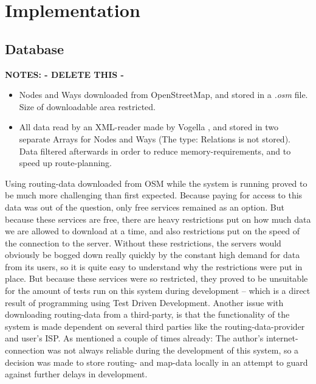 \chapter{Implementation}




\section{Database}
\textbf{NOTES: - DELETE THIS -}
\begin{itemize}
	\item Nodes and Ways downloaded from OpenStreetMap\cite{OSM}, and stored in a \textit{.osm} file. Size of downloadable area restricted.
	\item All data read by an XML-reader made by Vogella \cite{Vogella-XML}, and stored in two separate Arrays for Nodes and Ways (The type: Relations is not stored). Data filtered afterwards in order to reduce memory-requirements, and to speed up route-planning.
\end{itemize}

Using routing-data downloaded from OSM while the system is running proved to be much more challenging than first expected. Because paying for access to this data was out of the question, only free services remained as an option. But because these services are free, there are heavy restrictions put on how much data we are allowed to download at a time, and also restrictions put on the speed of the connection to the server. Without these restrictions, the servers would obviously be bogged down really quickly by the constant high demand for data from its users, so it is quite easy to understand why the restrictions were put in place. But because these services were so restricted, they proved to be unsuitable for the amount of tests run on this system during development -- which is a direct result of programming using Test Driven Development.
Another issue with downloading routing-data from a third-party, is that the functionality of the system is made dependent on several third parties like the routing-data-provider and user's ISP.
As mentioned a couple of times already: The author's internet-connection was not always reliable during the development of this system, so a decision was made to store routing- and map-data locally in an attempt to guard against further delays in development.

